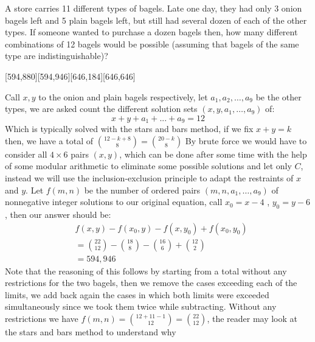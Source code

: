 \documentclass[12pt]{article}
\newcounter{problem}
\begin{document}
\begin{problem}[C][7][AMATYC Spring 2018/12]
   A store carries 11 different types of bagels. Late one day, they had only 3 onion bagels left and 5 plain bagels left, but still had several dozen of each of the other types. If someone wanted to purchase a dozen bagels then, how many different combinations of 12 bagels would be possible (assuming that bagels of the same type are indistinguishable)? 
\end{problem}
[594,880][594,946][646,184][646,646]
\begin{solution}[C]
   Call $x,y$ to the onion and plain bagels respectively, let $a_1,a_2,\ldots,a_9$ be the other types, we are asked count the different solution sets $(x,y,a_1,\ldots,a_9)$ of:
    $$ x+y+a_1+...+a_9 = 12$$
    Which is typically solved with the stars and bars method, if we fix $x+y=k$ then, we have a total of $\binom{12-k+8}{8} = \binom{20-k}{8}$
    By brute force we would have to consider all $4 \times 6$ pairs $(x,y)$, which can be done after some time with the help of some modular arithmetic to eliminate some possible solutions and let only $C$, instead we will use the inclusion-exclusion principle to adapt the restraints of $x$ and $y$.\medbreak
    Let $f(m,n)$ be the number of ordered pairs $(m,n,a_1,\ldots,a_9)$ of nonnegative integer solutions to our original equation, call $x_0=x-4$ , $y_0=y-6$, then our answer should be:
    \begin{align*}
        &f(x,y) - f(x_0,y) - f(x,y_0) + f(x_0,y_0) \\
        &= \binom{22}{12} - \binom{18}{8} - \binom{16}{6} + \binom{12}{2} \\
        &= \boxed{594,946}
    \end{align*}
    Note that the reasoning of this follows by starting from a total without any restrictions for the two bagels, then we remove the cases exceeding each of the limits, we add back again the cases in which both limits were exceeded simultaneously since we took them twice while subtracting. Without any restrictions we have $f(m,n) = \binom{12+11-1}{12}= \binom{22}{12}$, the reader may look at the stars and bars method to understand why
\end{solution}
\end{document}
